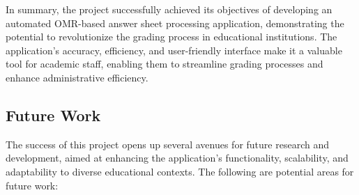 \documentclass[twocolumn]{article}
\begin{document}
In summary, the project successfully achieved its objectives of developing an automated OMR-based answer sheet processing application, demonstrating the potential to revolutionize the grading process in educational institutions. The application's accuracy, efficiency, and user-friendly interface make it a valuable tool for academic staff, enabling them to streamline grading processes and enhance administrative efficiency.


\subsection{Future Work}

The success of this project opens up several avenues for future research and development, aimed at enhancing the application's functionality, scalability, and adaptability to diverse educational contexts. The following are potential areas for future work:
\end{document}
